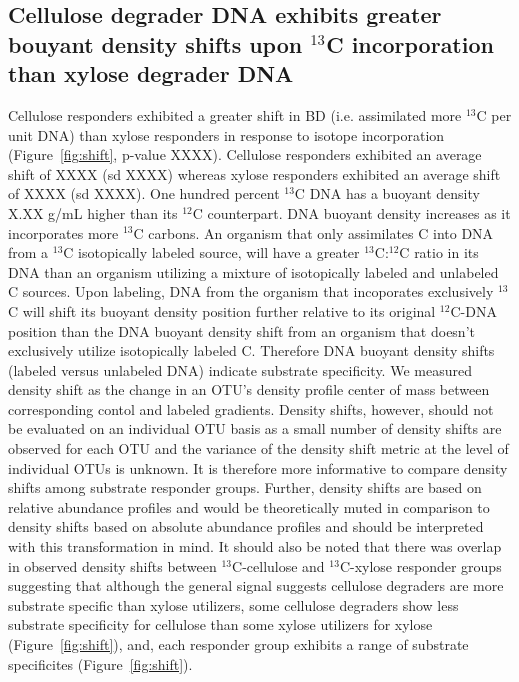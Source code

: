 \subsection{Cellulose degrader DNA exhibits greater bouyant density shifts upon
$^{13}$C incorporation than xylose degrader DNA} 
Cellulose responders exhibited a greater shift in BD (i.e. assimilated more
$^{13}$C per unit DNA) than xylose responders in response to isotope
incorporation (Figure~\ref{fig:shift}, p-value XXXX). Cellulose responders exhibited an average shift of 
XXXX (sd XXXX) whereas xylose responders exhibited an average shift of XXXX (sd XXXX).
One hundred percent $^{13}$C DNA has a buoyant density X.XX g/mL higher than
its $^{12}$C counterpart. DNA buoyant density increases as it incorporates
more $^{13}$C carbons. An organism that only assimilates C into DNA from a
$^{13}$C isotopically labeled source, will have a greater $^{13}$C:$^{12}$C
ratio in its DNA than an organism utilizing a mixture of isotopically labeled
and unlabeled C sources. Upon labeling, DNA from the organism that incoporates
exclusively $^{13}$C will shift its buoyant density position further relative
to its original $^{12}$C-DNA position than the DNA buoyant density shift from
an organism that doesn't exclusively utilize isotopically labeled C. Therefore
DNA buoyant density shifts (labeled versus unlabeled DNA) indicate substrate
specificity.  We measured density shift as the change in an OTU's density
profile center of mass between corresponding contol and labeled gradients. Density
shifts, however, should not be evaluated on an individual OTU basis as a small
number of density shifts are observed for each OTU and the variance of the density
shift metric at the level of individual OTUs is unknown. It is therefore more
informative to compare density shifts among substrate responder groups. Further, density
shifts are based on relative abundance profiles and would be theoretically muted in comparison to
density shifts based on absolute abundance profiles and should be interpreted with this
transformation in mind. It should
also be noted that there was overlap in observed density shifts between $^{13}$C-cellulose
and $^{13}$C-xylose responder groups suggesting that although the general signal suggests
cellulose degraders are more substrate specific than xylose utilizers, some cellulose degraders
show less substrate specificity for cellulose than some xylose utilizers for
xylose (Figure~\ref{fig:shift}), and, each responder group exhibits a range of substrate
specificites (Figure~\ref{fig:shift}).

